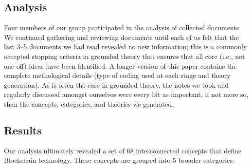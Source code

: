\subsection{Analysis}

Four members of our group participated in the analysis of collected documents.
We continued gathering and reviewing documents until each of us felt that the last 3--5 documents we had read revealed no new information; this is a commonly accepted stopping criteria in grounded theory that ensures that all core (i.e., not one-off) ideas have been identified. A longer version of this paper  contains the complete methological details (type of coding used at each stage and theory generation). As is often the case in grounded theory, the notes we took and regularly discussed amongst ourselves were every bit as important, if not more so, than the concepts, categories, and theories we generated.




\subsection{Results}

Our analysis ultimately revealed a set of 68 interconnected concepts that  define Blockchain technology. These concepts are grouped into 5 broader categories:

